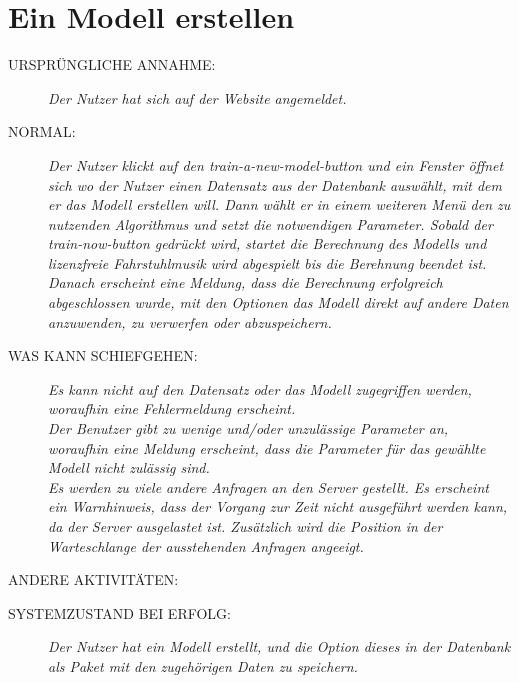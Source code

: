 \section{Ein Modell erstellen}
\begin{description}  
 \item [URSPRÜNGLICHE ANNAHME:]
    \textit{Der Nutzer hat sich auf der Website angemeldet.}
  \item [NORMAL:]
    \textit{Der Nutzer klickt auf den train-a-new-model-button und ein Fenster öffnet sich wo der Nutzer einen Datensatz aus der Datenbank auswählt, mit dem er das Modell erstellen will. Dann wählt er in einem weiteren Menü den zu nutzenden Algorithmus und setzt die notwendigen Parameter. Sobald der train-now-button gedrückt wird, startet die Berechnung des Modells und lizenzfreie Fahrstuhlmusik wird abgespielt bis die Berehnung beendet ist. Danach erscheint eine Meldung, dass die Berechnung erfolgreich abgeschlossen wurde, mit den Optionen das Modell direkt auf andere Daten anzuwenden, zu verwerfen oder abzuspeichern.}
  \item [WAS KANN SCHIEFGEHEN:]
    \textit{Es kann nicht auf den Datensatz oder das Modell zugegriffen werden, woraufhin eine Fehlermeldung erscheint.\\
Der Benutzer gibt zu wenige und/oder unzulässige Parameter an, woraufhin eine Meldung erscheint, dass die Parameter für das gewählte Modell nicht zulässig sind.\\
Es werden zu viele andere Anfragen an den Server gestellt. Es erscheint ein Warnhinweis, dass der Vorgang zur Zeit nicht ausgeführt werden kann, da der Server ausgelastet ist. Zusätzlich wird die Position in der Warteschlange der ausstehenden Anfragen angeeigt.
}
  \item [ANDERE AKTIVITÄTEN:]
    \textit{}
  \item [SYSTEMZUSTAND BEI ERFOLG:]
    \textit{Der Nutzer hat ein Modell erstellt, und die Option dieses in der Datenbank als Paket mit den zugehörigen Daten zu speichern.}
\end{description}

